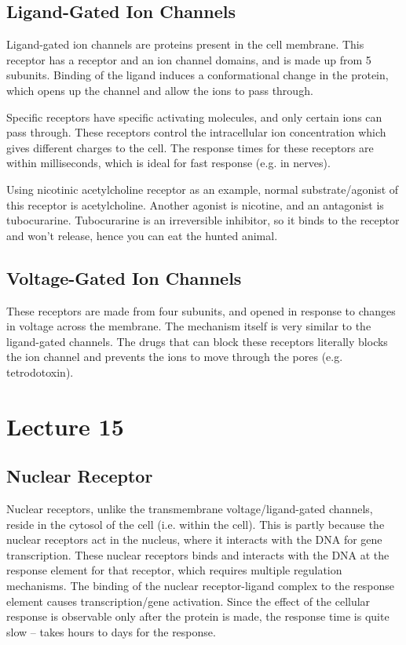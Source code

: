 \documentclass[a4paper, 12pt]{report}
\newcommand{\mychapter}[2]{
    \setcounter{chapter}{#1}
    \setcounter{section}{0}
    \chapter*{#2}
    \addcontentsline{toc}{chapter}{#2}
}
\begin{document}
\section{Ligand-Gated Ion Channels}

Ligand-gated ion channels are proteins present in the cell membrane.
This receptor has a receptor and an ion channel domains, and is made up from 5 subunits.
Binding of the ligand induces a conformational change in the protein, which opens up the channel and allow the ions to pass through.

Specific receptors have specific activating molecules, and only certain ions can pass through.
These receptors control the intracellular ion concentration which gives different charges to the cell.
The response times for these receptors are within milliseconds, which is ideal for fast response (e.g. in nerves).

Using nicotinic acetylcholine receptor as an example, normal substrate/agonist of this receptor is acetylcholine.
Another agonist is nicotine, and an antagonist is tubocurarine.
Tubocurarine is an irreversible inhibitor, so it binds to the receptor and won't release, hence you can eat the hunted animal.

\section{Voltage-Gated Ion Channels}

These receptors are made from four subunits, and opened in response to changes in voltage across the membrane.
The mechanism itself is very similar to the ligand-gated channels.
The drugs that can block these receptors literally blocks the ion channel and prevents the ions to move through the pores (e.g. tetrodotoxin).

\mychapter{15}{Lecture 15}

\section{Nuclear Receptor}

Nuclear receptors, unlike the transmembrane voltage/ligand-gated channels, reside in the cytosol of the cell (i.e. within the cell).
This is partly because the nuclear receptors act in the nucleus, where it interacts with the DNA for gene transcription.
These nuclear receptors binds and interacts with the DNA at the response element for that receptor, which requires multiple regulation mechanisms.
The binding of the nuclear receptor-ligand complex to the response element causes transcription/gene activation.
Since the effect of the cellular response is observable only after the protein is made, the response time is quite slow -- takes hours to days for the response.
\end{document}
